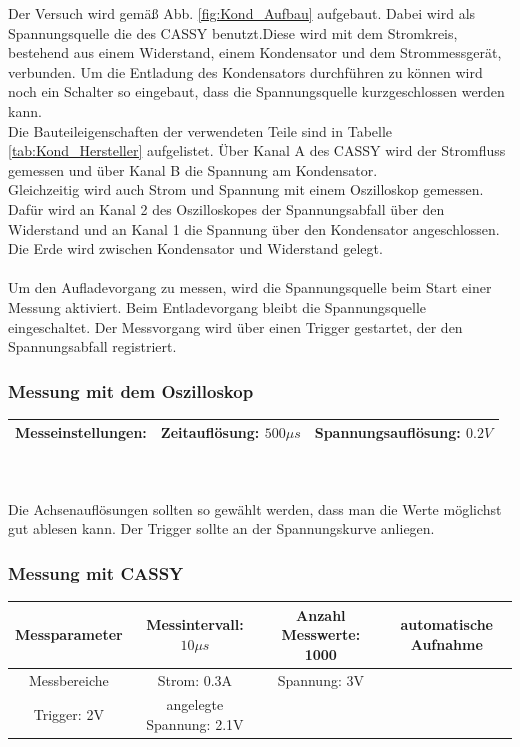 \documentclass[12pt,a4paper]{article}
\begin{document}
Der Versuch wird gemäß Abb. \ref{fig:Kond_Aufbau} aufgebaut. Dabei wird als Spannungsquelle die des CASSY benutzt.Diese wird mit dem Stromkreis, bestehend aus einem Widerstand, einem Kondensator und dem Strommessgerät, verbunden. Um die Entladung des Kondensators durchführen zu können wird noch ein Schalter so eingebaut, dass die Spannungsquelle kurzgeschlossen werden kann.\\ 
Die Bauteileigenschaften  der verwendeten Teile sind in Tabelle \ref{tab:Kond_Hersteller} aufgelistet.
Über Kanal A des CASSY wird der Stromfluss gemessen und über Kanal B die Spannung am Kondensator.\\
Gleichzeitig wird auch Strom und Spannung mit einem Oszilloskop gemessen. Dafür wird an Kanal 2 des Oszilloskopes der Spannungsabfall über den Widerstand und an Kanal 1 die Spannung über den Kondensator angeschlossen. Die Erde wird zwischen Kondensator und Widerstand gelegt.\\
\\
Um den Aufladevorgang zu messen, wird die Spannungsquelle beim Start einer Messung aktiviert.
Beim Entladevorgang bleibt die Spannungsquelle eingeschaltet. Der Messvorgang wird über einen Trigger gestartet, der den Spannungsabfall registriert.
\subsubsection{Messung mit dem Oszilloskop}
\begin{tabular}{|c|c|c|}
\hline
Messeinstellungen: & Zeitauflösung: $500\mu s$  & Spannungsauflösung: $0.2V$ \\ 
\hline
\end{tabular} 
\\
\\
Die Achsenauflösungen sollten so gewählt werden, dass man die Werte möglichst gut ablesen kann.
Der Trigger sollte an der Spannungskurve anliegen.
\subsubsection{Messung mit CASSY}
\begin{tabular}{|c|c|c|c|}
\hline
Messparameter & Messintervall: $10\mu s$  & Anzahl Messwerte: 1000 & automatische Aufnahme \\ 
\hline
Messbereiche & Strom: 0.3A & Spannung: 3V & \\
\hline
Trigger: 2V & angelegte Spannung: 2.1V & &\\
\hline
\end{tabular} 
\end{document}
